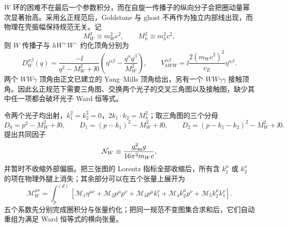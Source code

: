 \begin{derivation}
$W$ 环的困难不在最后一个参数积分，而在自旋一传播子的纵向分子会把圈动量幂次显著抬高。采用幺正规范后，Goldstone 与 ghost 不再作为独立内部线出现，而物理在壳振幅保持规范无关。记
\[
M_W^2\equiv m_W^2c^2,\qquad M_h^2\equiv m_h^2c^2,
\]
则 $W$ 传播子与 $hW^+W^-$ 约化顶角分别为
\begin{equation*}
 D_W^{\alpha\beta}(q)
 =\frac{-\ii}{q^2-M_W^2+\ii0}
 \left(\eta^{\alpha\beta}-\frac{q^\alpha q^\beta}{M_W^2}\right),
 \qquad
 V_{hWW}^{\alpha\beta}=\ii\frac{2(m_Wc^2)^2}{v_E}\eta^{\alpha\beta}.
\end{equation*}
两个 $WW\gamma$ 顶角由正文已建立的 Yang--Mills 顶角给出，另有一个 $WW\gamma\gamma$ 接触顶角。因此幺正规范下需要三角图、交换两个光子的交叉三角图以及接触图，缺少其中任一项都会破坏光子 Ward 恒等式。

令两个光子均出射，$k_1^2=k_2^2=0$，$2k_1\!\cdot k_2=M_h^2$；取三角图的三个分母
\begin{equation*}
D_0=p^2-M_W^2+\ii0,\qquad
D_1=(p-k_1)^2-M_W^2+\ii0,\qquad
D_2=(p-k_1-k_2)^2-M_W^2+\ii0.
\end{equation*}
提出共同因子
\begin{equation*}
\mathcal N_W\equiv\frac{g_{\rm em}^2g}{16\pi^2m_Wc},
\end{equation*}
并暂时不收缩外部偏振。把三张图的 Lorentz 指标全部收缩后，所有含 $k_1^\mu$ 或 $k_2^\nu$ 的项在物理外腿上消失；其余部分可以在五个张量上展开为
\begin{equation*}
\mathcal M_W^{\mu\nu}
=\int_p^{(d)}\!
\left[
\mathscr M_1\eta^{\mu\nu}
+\mathscr M_2p^\mu p^\nu
+\mathscr M_3p^\mu k_1^\nu
+\mathscr M_4k_2^\mu p^\nu
+\mathscr M_5k_2^\mu k_1^\nu
\right].
\end{equation*}
五个系数先分别完成圈积分与张量约化；把同一规范不变图集合求和后，它们自动重组为满足 Ward 恒等式的横向张量。


\end{derivation}
